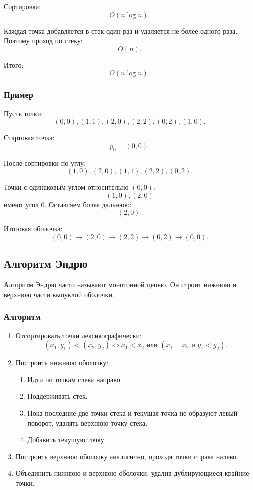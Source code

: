 \documentclass[12pt,a4paper]{article}
\begin{document}
Сортировка:
\[
O(n\log n).
\]

Каждая точка добавляется в стек один раз и удаляется не более одного раза. Поэтому проход по стеку:
\[
O(n).
\]

Итого:
\[
O(n\log n).
\]

\subsubsection{Пример}

Пусть точки:
\[
(0,0),(1,1),(2,0),(2,2),(0,2),(1,0).
\]

Стартовая точка:
\[
p_0=(0,0).
\]

После сортировки по углу:
\[
(1,0),(2,0),(1,1),(2,2),(0,2).
\]

Точки с одинаковым углом относительно \((0,0)\):
\[
(1,0),(2,0)
\]
имеют угол \(0\). Оставляем более дальнюю:
\[
(2,0).
\]

Итоговая оболочка:
\[
(0,0)\to(2,0)\to(2,2)\to(0,2)\to(0,0).
\]

\subsection{Алгоритм Эндрю}

Алгоритм Эндрю часто называют монотонной цепью. Он строит нижнюю и верхнюю части выпуклой оболочки.

\subsubsection{Алгоритм}

\begin{enumerate}
    \item Отсортировать точки лексикографически:
    \[
    (x_1,y_1)<(x_2,y_2)
    \Longleftrightarrow
    x_1<x_2
    \text{ или }
    (x_1=x_2 \text{ и } y_1<y_2).
    \]
    \item Построить нижнюю оболочку:
    \begin{enumerate}
        \item Идти по точкам слева направо.
        \item Поддерживать стек.
        \item Пока последние две точки стека и текущая точка не образуют левый поворот, удалять верхнюю точку стека.
        \item Добавить текущую точку.
    \end{enumerate}
    \item Построить верхнюю оболочку аналогично, проходя точки справа налево.
    \item Объединить нижнюю и верхнюю оболочки, удалив дублирующиеся крайние точки.
\end{enumerate}
\end{document}
